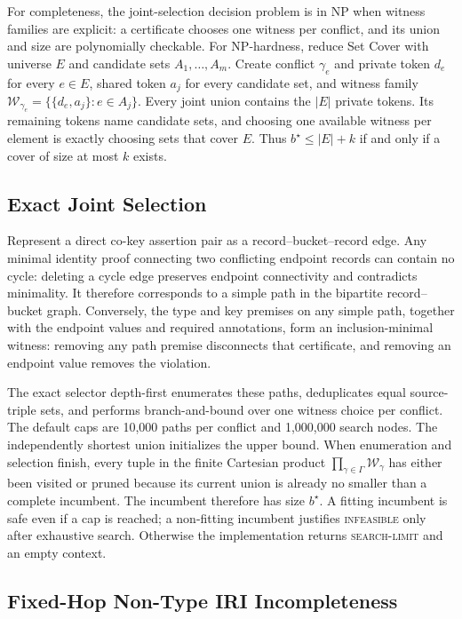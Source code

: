 \documentclass[letterpaper]{article}
\newcommand{\W}{\mathcal{W}}
\begin{document}
For completeness, the joint-selection decision problem is in NP when witness
families are explicit: a certificate chooses one witness per conflict, and its
union and size are polynomially checkable.  For NP-hardness, reduce Set Cover
with universe $E$ and candidate sets $A_1,\ldots,A_m$.  Create conflict
$\gamma_e$ and private token $d_e$ for every $e\in E$, shared token $a_j$ for
every candidate set, and witness family
$\W_{\gamma_e}=\{\{d_e,a_j\}:e\in A_j\}$.  Every joint union contains the
$|E|$ private tokens.  Its remaining tokens name candidate sets, and choosing
one available witness per element is exactly choosing sets that cover $E$.
Thus $b^\star\le |E|+k$ if and only if a cover of size at most $k$ exists.

\subsection{Exact Joint Selection}

Represent a direct co-key assertion pair as a record--bucket--record edge.
Any minimal identity proof connecting two conflicting endpoint records can
contain no cycle: deleting a cycle edge preserves endpoint connectivity and
contradicts minimality.  It therefore corresponds to a simple path in the
bipartite record--bucket graph.  Conversely, the type and key premises on any
simple path, together with the endpoint values and required annotations, form
an inclusion-minimal witness: removing any path premise disconnects that
certificate, and removing an endpoint value removes the violation.

The exact selector depth-first enumerates these paths, deduplicates equal
source-triple sets, and performs branch-and-bound over one witness choice per
conflict.  The default caps are 10,000 paths per conflict and 1,000,000 search
nodes.  The independently shortest union initializes the upper bound.
When enumeration and selection finish, every tuple in the finite Cartesian
product $\prod_{\gamma\in\Gamma}\W_\gamma$ has either been visited or pruned
because its current union is already no smaller than a complete incumbent.
The incumbent therefore has size $b^\star$.  A fitting incumbent is safe even
if a cap is reached; a non-fitting incumbent justifies \textsc{infeasible}
only after exhaustive search.  Otherwise the implementation returns
\textsc{search-limit} and an empty context.

\subsection{Fixed-Hop Non-Type IRI Incompleteness}
\end{document}
